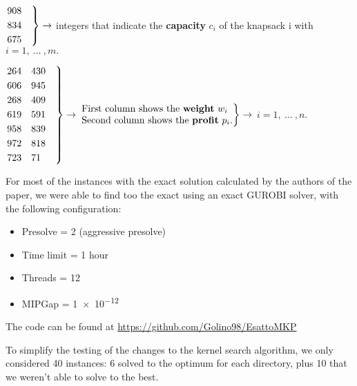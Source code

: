 \begin{flushleft}
    $\begin{rcases*}
         908 \quad
         \\834
         \\675
    \end{rcases*} \rightarrow $ integers that indicate the \textbf{capacity}  $ c_{i} $  of the knapsack i with \space $ i=1,\:\dots\:,m. $
\end{flushleft}
\begin{flushleft}
    $\begin{rcases*}
         264    \quad 430 \quad
         \\606 \quad    945
         \\268 \quad    409
         \\619 \quad    591
         \\958 \quad    839
         \\972 \quad    818
         \\723 \quad    71
    \end{rcases*} \rightarrow $
    $\begin{rcases*}
    {\begin{tabular}{@{}l@{}}
         First column shows the \textbf{weight} \(w_{i}\) \\
         Second column shows the \textbf{profit} \(p_{i}\).
    \end{tabular}}
    \end{rcases*} \rightarrow \space$ $ i=1,\:\dots\:,n. $
\end{flushleft}

For most of the instances with the exact solution calculated by the authors of the paper, we were able to
find too the exact using an exact GUROBI solver, with the following configuration:

\begin{itemize}
    \item Presolve = 2 (aggressive presolve)
    \item Time limit = 1 hour
    \item Threads = 12
    \item MIPGap = \num{1e-12}
\end{itemize}

The code can be found at \url{https://github.com/Golino98/EsattoMKP}

To simplify the testing of the changes to the kernel search algorithm,
we only considered 40 instances: 6 solved to the optimum for each directory,
plus 10 that we weren't able to solve to the best.

